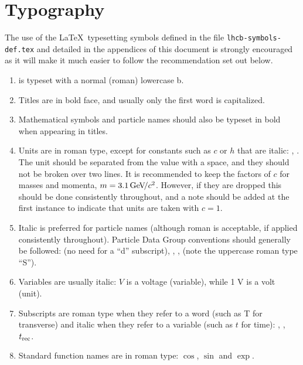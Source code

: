 \section{Typography}
\label{sec:typography}

The use of the \LaTeX\ typesetting symbols defined in the file
\texttt{lhcb-symbols-def.tex} and detailed in the appendices of this
document is strongly encouraged as it will make it much easier to
follow the recommendation set out below.

\begin{enumerate}

\item \lhcb is typeset with a normal (roman) lowercase b.

\item Titles are in bold face, and usually only the first word is
  capitalized.

\item Mathematical symbols and particle names should also be typeset
  in bold when appearing in titles.

\item Units are in roman type, except for constants such as $c$ or $h$
  that are italic: \gev, \gevcc.  The unit should be separated from
  the value with a space, and they should not be broken over two
  lines.  It is recommended to keep the factors of $c$ for masses and
  momenta, \eg $m = 3.1{\mathrm{\,Ge\kern -0.1em V\!/}c^2}$. However, if they are dropped this
  should be done consistently throughout, and a note should be added
  at the first instance to indicate that units are taken with $c=1$.

\item Italic is preferred for particle names (although roman is
  acceptable, if applied consistently throughout).  Particle Data
  Group conventions should generally be followed: \Bd (no need for a
  ``d'' subscript), \decay{\Bs}{\jpsi\phi}, \Bsb, \KS (note the
  uppercase roman type ``S'').

\item Variables are usually italic: $V$ is a voltage (variable), while
  1 V is a volt (unit).

\item Subscripts are roman type when they refer to a word (such as T
  for transverse) and italic when they refer to a variable (such as
  $t$ for time): \pt, \dms, $t_{\rm rec}$.

\item Standard function names are in roman type: \eg $\cos$, $\sin$
  and $\exp$.


\end{enumerate}
